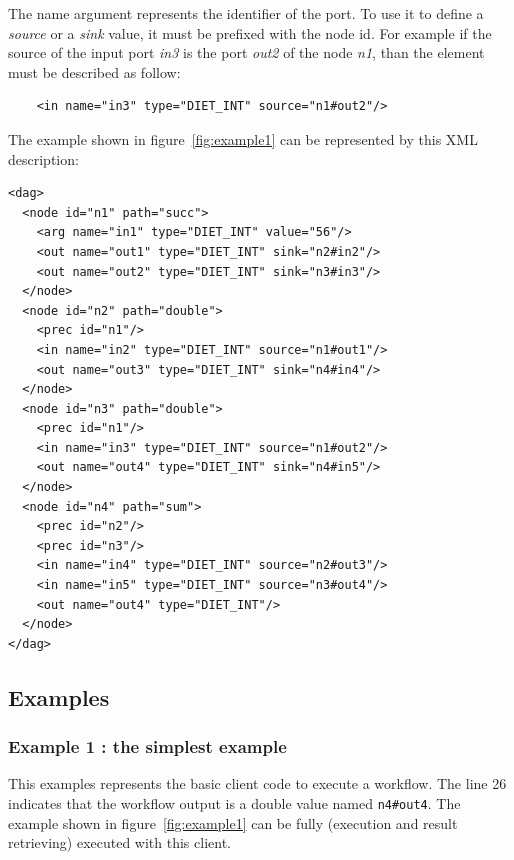 The name argument represents the identifier of the port. To use it to
define a \textit{source} or a \textit{sink} value, it must be prefixed
with the node id. For example if the source of the input port
\textit{in3} is the port \textit{out2} of the node \textit{n1}, than
the element must be described as follow:

\begin{verbatim}
    <in name="in3" type="DIET_INT" source="n1#out2"/>
\end{verbatim}

The example shown in figure~\ref{fig:example1} can be represented by
this XML description:

\begin{verbatim}
<dag>
  <node id="n1" path="succ">
    <arg name="in1" type="DIET_INT" value="56"/>
    <out name="out1" type="DIET_INT" sink="n2#in2"/>
    <out name="out2" type="DIET_INT" sink="n3#in3"/>
  </node>
  <node id="n2" path="double">
    <prec id="n1"/>
    <in name="in2" type="DIET_INT" source="n1#out1"/>
    <out name="out3" type="DIET_INT" sink="n4#in4"/>
  </node>
  <node id="n3" path="double">
    <prec id="n1"/>
    <in name="in3" type="DIET_INT" source="n1#out2"/>
    <out name="out4" type="DIET_INT" sink="n4#in5"/>
  </node>
  <node id="n4" path="sum">
    <prec id="n2"/>
    <prec id="n3"/>
    <in name="in4" type="DIET_INT" source="n2#out3"/>
    <in name="in5" type="DIET_INT" source="n3#out4"/>
    <out name="out4" type="DIET_INT"/>
  </node>
</dag>
\end{verbatim}

\subsection{Examples}
\label{sec:examples}


\subsubsection{Example 1 : the simplest example}
\label{sec:ex1}

This examples represents the basic client code to execute a workflow.
The line 26 indicates that the workflow output is a double value named
\verb|n4#out4|. The example shown in figure~\ref{fig:example1} can be
fully (execution and result retrieving) executed with this client.

